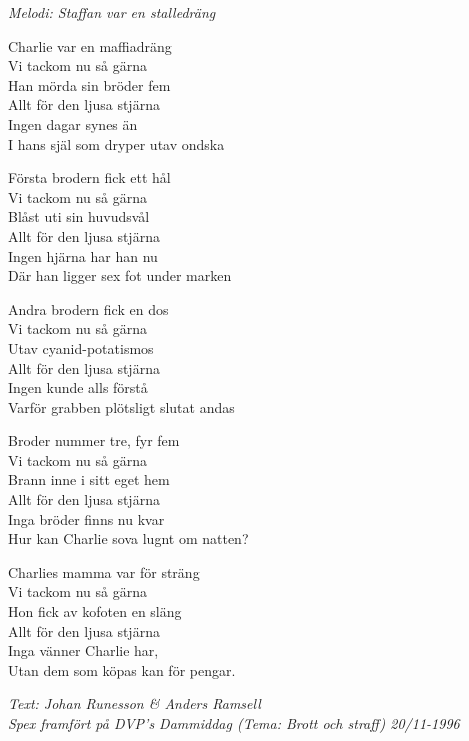 {\footnotesize\textit{Melodi: Staffan var en stalledräng}}\par
\vspace{10pt}
Charlie var en maffiadräng\\
Vi tackom nu så gärna\\
Han mörda sin bröder fem\\
Allt för den ljusa stjärna\\
Ingen dagar synes än\\
I hans själ som dryper utav ondska\par
\vspace{10pt}
Första brodern fick ett hål\\
Vi tackom nu så gärna\\
Blåst uti sin huvudsvål\\
Allt för den ljusa stjärna\\
Ingen hjärna har han nu\\
Där han ligger sex fot under marken\par
\vspace{10pt}
Andra brodern fick en dos\\
Vi tackom nu så gärna\\
Utav cyanid-potatismos\\
Allt för den ljusa stjärna\\
Ingen kunde alls förstå\\
Varför grabben plötsligt slutat andas\par
\vspace{10pt}
Broder nummer tre, fyr fem\\
Vi tackom nu så gärna\\
Brann inne i sitt eget hem\\
Allt för den ljusa stjärna\\
Inga bröder finns nu kvar\\
Hur kan Charlie sova lugnt om natten?\par
\vspace{10pt}
Charlies mamma var för sträng\\
Vi tackom nu så gärna\\
Hon fick av kofoten en släng\\
Allt för den ljusa stjärna\\
Inga vänner Charlie har,\\
Utan dem som köpas kan för pengar.\par
\vspace{10pt}
{\footnotesize\textit{Text: Johan Runesson \& Anders Ramsell\\Spex framfört på DVP's Dammiddag (Tema: Brott och straff) 20/11-1996}}
